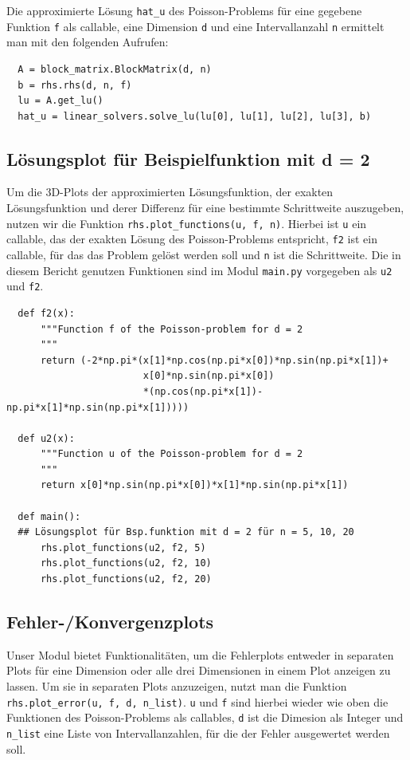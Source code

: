 \documentclass{scrartcl}
\begin{document}
Die approximierte Lösung \texttt{hat\_u} des Poisson-Problems für eine gegebene Funktion \texttt{f} als callable, eine Dimension \texttt{d} und eine Intervallanzahl \texttt{n} ermittelt man mit den folgenden Aufrufen:

\begin{verbatim}
  A = block_matrix.BlockMatrix(d, n)
  b = rhs.rhs(d, n, f)
  lu = A.get_lu()
  hat_u = linear_solvers.solve_lu(lu[0], lu[1], lu[2], lu[3], b)
\end{verbatim}

\subsection{Lösungsplot für Beispielfunktion mit d = 2}

Um die 3D-Plots der approximierten Lösungsfunktion, der exakten Lösungsfunktion und derer Differenz für eine bestimmte Schrittweite auszugeben, nutzen wir die Funktion \texttt{rhs.plot\_functions(u, f, n)}.
Hierbei ist \texttt{u} ein callable, das der exakten Lösung des Poisson-Problems entspricht, \texttt{f2} ist ein callable, für das das Problem gelöst werden soll und \texttt{n} ist die Schrittweite.
Die in diesem Bericht genutzen Funktionen sind im Modul \texttt{main.py} vorgegeben als \texttt{u2} und \texttt{f2}.

\begin{verbatim}
  def f2(x):
      """Function f of the Poisson-problem for d = 2
      """
      return (-2*np.pi*(x[1]*np.cos(np.pi*x[0])*np.sin(np.pi*x[1])+
                        x[0]*np.sin(np.pi*x[0])
                        *(np.cos(np.pi*x[1])- np.pi*x[1]*np.sin(np.pi*x[1]))))

  def u2(x):
      """Function u of the Poisson-problem for d = 2
      """
      return x[0]*np.sin(np.pi*x[0])*x[1]*np.sin(np.pi*x[1])

  def main():
  ## Lösungsplot für Bsp.funktion mit d = 2 für n = 5, 10, 20
      rhs.plot_functions(u2, f2, 5)
      rhs.plot_functions(u2, f2, 10)
      rhs.plot_functions(u2, f2, 20)
\end{verbatim}

\subsection{Fehler-/Konvergenzplots}

Unser Modul bietet Funktionalitäten, um die Fehlerplots entweder in separaten Plots für eine Dimension oder alle drei Dimensionen in einem Plot anzeigen zu lassen.
Um sie in separaten Plots anzuzeigen, nutzt man die Funktion \texttt{rhs.plot\_error(u, f, d, n\_list)}.
\texttt{u} und \texttt{f} sind hierbei wieder wie oben die Funktionen des Poisson-Problems als callables, \texttt{d} ist die Dimesion als Integer und \texttt{n\_list} eine Liste von Intervallanzahlen, für die der Fehler ausgewertet werden soll.
\end{document}
